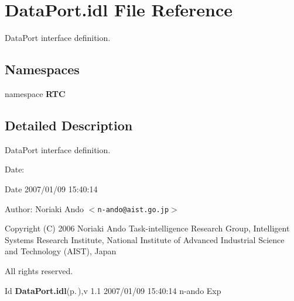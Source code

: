 \section{Data\-Port.idl File Reference}
\label{DataPort_8idl}
Data\-Port interface definition. 

\subsection*{Namespaces}
\begin{CompactItemize}
\item 
namespace {\bf RTC}
\end{CompactItemize}


\subsection{Detailed Description}
Data\-Port interface definition. 

\begin{Desc}
\item[Date:]\begin{Desc}
\item[Date]2007/01/09 15:40:14 \end{Desc}
\end{Desc}
\begin{Desc}
\item[Author:]Noriaki Ando $<${\tt n-ando@aist.go.jp}$>$\end{Desc}
Copyright (C) 2006 Noriaki Ando Task-intelligence Research Group, Intelligent Systems Research Institute, National Institute of Advanced Industrial Science and Technology (AIST), Japan

All rights reserved.

\begin{Desc}
\item[Id]{\bf Data\-Port.idl}{\rm (p.\,\pageref{DataPort_8idl})},v 1.1 2007/01/09 15:40:14 n-ando Exp \end{Desc}
